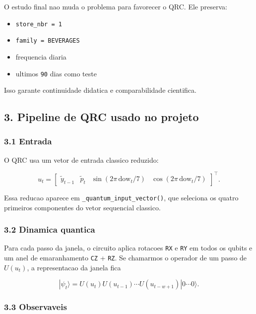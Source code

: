 \documentclass[12pt]{article}
\providecommand{\tightlist}{%
          \setlength{\itemsep}{0pt}\setlength{\parskip}{0pt}}
\begin{document}
O estudo final nao muda o problema para favorecer o QRC. Ele preserva:

\begin{itemize}
\tightlist
\item
  \texttt{store\_nbr\ =\ 1}
\item
  \texttt{family\ =\ BEVERAGES}
\item
  frequencia diaria
\item
  ultimos \texttt{90} dias como teste
\end{itemize}

Isso garante continuidade didatica e comparabilidade cientifica.

\subsection{3. Pipeline de QRC usado no projeto}\label{3-pipeline-de-qrc-usado-no-projeto}

\subsubsection{3.1 Entrada}\label{31-entrada}

O QRC usa um vetor de entrada classico reduzido:

\[
u_t =
\begin{bmatrix}
\widetilde{y}_{t-1} &
\widetilde{p}_t &
\sin(2\pi \, \mathrm{dow}_t / 7) &
\cos(2\pi \, \mathrm{dow}_t / 7)
\end{bmatrix}^\top.
\]

Essa reducao aparece em \texttt{\_quantum\_input\_vector()}, que seleciona os quatro primeiros componentes do vetor sequencial classico.

\subsubsection{3.2 Dinamica quantica}\label{32-dinamica-quantica}

Para cada passo da janela, o circuito aplica rotacoes \texttt{RX} e \texttt{RY} em todos os qubits e um anel de emaranhamento \texttt{CZ} + \texttt{RZ}. Se chamarmos o operador de um passo de \(U(u_t)\), a representacao da janela fica

\[
|\psi_t\rangle = U(u_t) U(u_{t-1}) \cdots U(u_{t-w+1}) |0 \cdots 0\rangle.
\]

\subsubsection{3.3 Observaveis}\label{33-observaveis}
\end{document}
